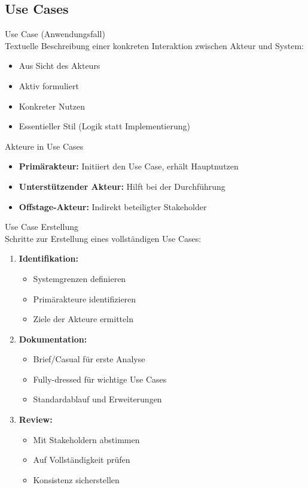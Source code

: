 \subsection{Use Cases}

\begin{definition}{Use Case (Anwendungsfall)}\\
Textuelle Beschreibung einer konkreten Interaktion zwischen Akteur und System:
\begin{itemize}
    \item Aus Sicht des Akteurs
    \item Aktiv formuliert
    \item Konkreter Nutzen
    \item Essentieller Stil (Logik statt Implementierung)
\end{itemize}
\end{definition}

\begin{theorem}{Akteure in Use Cases}
\begin{itemize}
    \item \textbf{Primärakteur:} Initiiert den Use Case, erhält Hauptnutzen
    \item \textbf{Unterstützender Akteur:} Hilft bei der Durchführung
    \item \textbf{Offstage-Akteur:} Indirekt beteiligter Stakeholder
\end{itemize}
\end{theorem}

\begin{KR}{Use Case Erstellung}\\
Schritte zur Erstellung eines vollständigen Use Cases:
\begin{enumerate}
    \item \textbf{Identifikation:}
    \begin{itemize}
        \item Systemgrenzen definieren
        \item Primärakteure identifizieren
        \item Ziele der Akteure ermitteln
    \end{itemize}
    \item \textbf{Dokumentation:}
    \begin{itemize}
        \item Brief/Casual für erste Analyse
        \item Fully-dressed für wichtige Use Cases
        \item Standardablauf und Erweiterungen
    \end{itemize}
    \item \textbf{Review:}
    \begin{itemize}
        \item Mit Stakeholdern abstimmen
        \item Auf Vollständigkeit prüfen
        \item Konsistenz sicherstellen
    \end{itemize}
\end{enumerate}
\end{KR}

